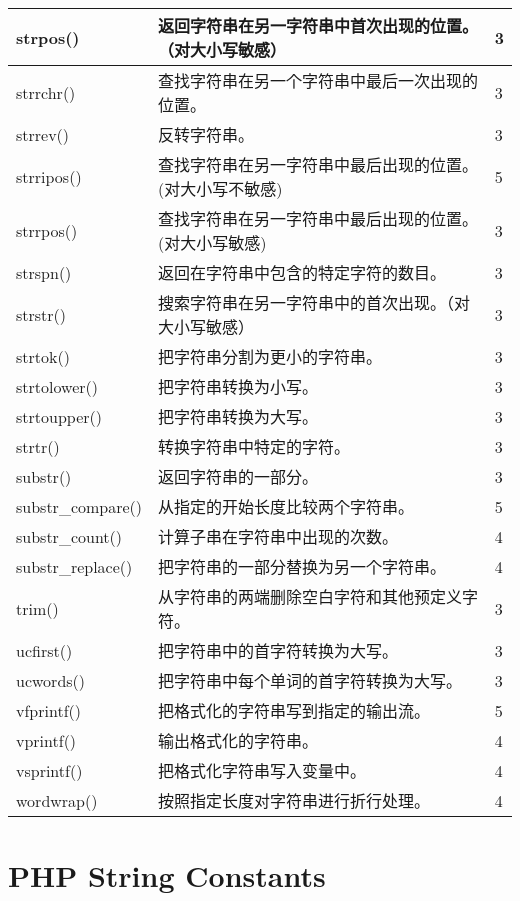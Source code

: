 \begin{longtable}{|m{120pt}|m{250pt}|m{20pt}|}
\hline
strpos()					&返回字符串在另一字符串中首次出现的位置。\newline（对大小写敏感）&	3\\
\hline
strrchr()					&查找字符串在另一个字符串中最后一次出现的位置。	&3\\
\hline
strrev()						&反转字符串。	&3\\
\hline
strripos()					&查找字符串在另一字符串中最后出现的位置。\newline (对大小写不敏感)	&5\\
\hline
strrpos()					&查找字符串在另一字符串中最后出现的位置。\newline (对大小写敏感)	&3\\
\hline
strspn()						&返回在字符串中包含的特定字符的数目。	&3\\
\hline
strstr()						&搜索字符串在另一字符串中的首次出现。\newline（对大小写敏感）	&3\\
\hline
strtok()						&把字符串分割为更小的字符串。	&3\\
\hline
strtolower()				&把字符串转换为小写。	&3\\
\hline
strtoupper()				&把字符串转换为大写。&	3\\
\hline
strtr()						&转换字符串中特定的字符。&	3\\
\hline
substr()						&返回字符串的一部分。	&3\\
\hline
substr\_compare()			&从指定的开始长度比较两个字符串。	&5\\
\hline
substr\_count()				&计算子串在字符串中出现的次数。	&4\\
\hline
substr\_replace()			&把字符串的一部分替换为另一个字符串。&	4\\
\hline
trim()						&从字符串的两端删除空白字符和其他预定义字符。&	3\\
\hline
ucfirst()						&把字符串中的首字符转换为大写。	&3\\
\hline
ucwords()					&把字符串中每个单词的首字符转换为大写。&	3\\
\hline
vfprintf()					&把格式化的字符串写到指定的输出流。	&5\\
\hline
vprintf()					&输出格式化的字符串。	&4\\
\hline
vsprintf()					&把格式化字符串写入变量中。&	4\\
\hline
wordwrap()					&按照指定长度对字符串进行折行处理。&	4\\
\hline
\end{longtable}


\section{PHP String Constants}






